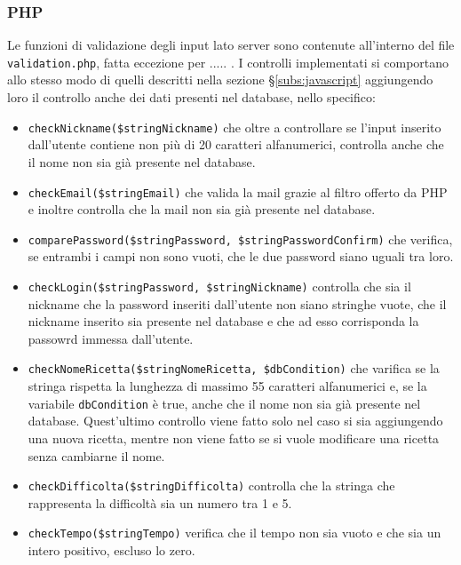 \subsubsection{PHP}\label{subs:php}
Le funzioni di validazione degli input lato server sono contenute all'interno del file \texttt{validation.php}, fatta eccezione per ..... . I controlli implementati si comportano allo stesso modo di quelli descritti nella sezione \S\ref{subs:javascript} aggiungendo loro il controllo anche dei dati presenti nel database, nello specifico:
\begin{itemize}
	\item \texttt{checkNickname(\$stringNickname)} che oltre a controllare se l'input inserito dall'utente contiene non più di 20 caratteri alfanumerici, controlla anche che il nome non sia già presente nel database.
	\item \texttt{checkEmail(\$stringEmail)} che valida la mail grazie al filtro offerto da PHP e inoltre controlla che la mail non sia già presente nel database.
	\item \texttt{comparePassword(\$stringPassword, \$stringPasswordConfirm)} che verifica, se entrambi i campi non sono vuoti, che le due password siano uguali tra loro. 
	\item \texttt{checkLogin(\$stringPassword, \$stringNickname)} controlla che sia il nickname che la password inseriti dall'utente non siano stringhe vuote, che il nickname inserito sia presente nel database e che ad esso corrisponda la passowrd immessa dall'utente.
	\item \texttt{checkNomeRicetta(\$stringNomeRicetta, \$dbCondition)} che varifica se la stringa rispetta la lunghezza di massimo 55 caratteri alfanumerici e, se la variabile \texttt{dbCondition} è true, anche che il nome non sia già presente nel database. Quest'ultimo controllo viene fatto solo nel caso si sia aggiungendo una nuova ricetta, mentre non viene fatto se si vuole modificare una ricetta senza cambiarne il nome.
	\item \texttt{checkDifficolta(\$stringDifficolta)} controlla che la stringa che rappresenta la difficoltà sia un numero tra 1 e 5.
	\item \texttt{checkTempo(\$stringTempo)} verifica che il tempo non sia vuoto e che sia un intero positivo, escluso lo zero.

\end{itemize}
